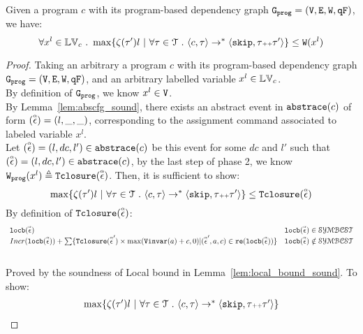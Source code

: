 
{
  \begin{thm}
    \label{thm:addweight_soundness}
  Given a program ${c}$ with its program-based dependency graph $\mathtt{{G_{prog}}} = (\mathtt{V}, \mathtt{E}, \mathtt{W}, \mathtt{qF})$, we have:
  \[
  \forall x^l \in \lvar_c \st 
  \max \left\{ \vcounter(\vtrace') l ~ \middle\vert~
  \forall \vtrace \in \mathcal{T} \st \config{{c}, \trace} \to^{*} \config{\eskip, \trace\tracecat\vtrace'} \right\} 
  \leq 
  \weights(x^l)
  \]
  \end{thm}
}
\begin{proof}
  Taking an arbitrary a program ${c}$ with its program-based dependency graph $\mathtt{{G_{prog}}} = (\mathtt{V}, \mathtt{E}, \mathtt{W}, \mathtt{qF})$, 
  and an arbitrary labelled variable $x^l \in \mathbb{LV}_c$.
  \\
  By definition of $\mathtt{{G_{prog}}}$, we know $ x^l \in \mathtt{V}$. 
  \\
  By Lemma~\ref{lem:abscfg_sound}, there exists an abstract event in $\mathtt{abs}{\mathtt{trace}}(c)$ of form $(\stackrel{\scriptscriptstyle{\alpha}}{\mathtt{\epsilon}{}}) = (l, \_, \_)$,
  corresponding to the assignment command associated to labeled variable 
  $x^l$. 
  \\
  Let $(\stackrel{\scriptscriptstyle{\alpha}}{\mathtt{\epsilon}{}}) = (l, dc, l') \in \mathtt{abs}{\mathtt{trace}}(c)$ be this event for some $dc$ and $l'$ such that  $(\stackrel{\scriptscriptstyle{\alpha}}{\mathtt{\epsilon}{}}) = (l, dc, l') \in \mathtt{abs}{\mathtt{trace}}(c)$,
  by the last step of phase 2, we know
  $
  \mathtt{{W_{prog}}}(x^l) 
  \triangleq {\ensuremath{\mathtt{Tclosure}}}(\stackrel{\scriptscriptstyle{\alpha}}{\mathtt{\epsilon}{}})
  $.
   Then, it is sufficient to show:
  \[
    \max \left\{ \vcounter(\vtrace') l ~ \middle\vert~
  \forall \vtrace \in \mathcal{T} \st \config{{c}, \trace} \to^{*} \config{\eskip, \trace\tracecat\vtrace'} \right\} 
  \leq 
  \absclr(\absevent)
  \]
  By definition of ${\mathtt{Tclosure}}(\stackrel{\scriptscriptstyle{\alpha}}{\mathtt{\epsilon}{}})$:
  \[
 \begin{array}{ll}
  \mathtt{locb}(\stackrel{\scriptscriptstyle{\alpha}}{\mathtt{\epsilon}{}}) & \mathtt{locb}(\stackrel{\scriptscriptstyle{\alpha}}{\mathtt{\epsilon}{}}) \in \mathcal{SYMBCST} \\
  Incr(\mathtt{locb}(\stackrel{\scriptscriptstyle{\alpha}}{\mathtt{\epsilon}{}})) + 
  \sum\{{\mathtt{Tclosure}}(\stackrel{\scriptscriptstyle{\alpha}}{\mathtt{\epsilon}{}}') \times \max({\mathtt{Vinvar}}(a) + c, 0) | (\stackrel{\scriptscriptstyle{\alpha}}{\mathtt{\epsilon}{}}', a, c) \in \mathtt{re}(\mathtt{locb}(\stackrel{\scriptscriptstyle{\alpha}}{\mathtt{\epsilon}{}}))\} 
  & \mathtt{locb}(\stackrel{\scriptscriptstyle{\alpha}}{\mathtt{\epsilon}{}}) \notin \mathcal{SYMBCST}
\end{array}
\]
  \caseL{$\locbound(\absevent) \in \constdom$}
  \\
  Proved by the soundness of Local bound in Lemma~\ref{lem:local_bound_sound}.
  \caseL{$\locbound(\absevent) \notin \constdom$}
To show:
\[
  \begin{array}{l}
    \max \left\{ \vcounter(\vtrace') l ~ \middle\vert~
\forall \vtrace \in \mathcal{T} \st \config{{c}, \trace} \to^{*} \config{\eskip, \trace\tracecat\vtrace'} \right\} 

\end{array}\]
\end{proof}
